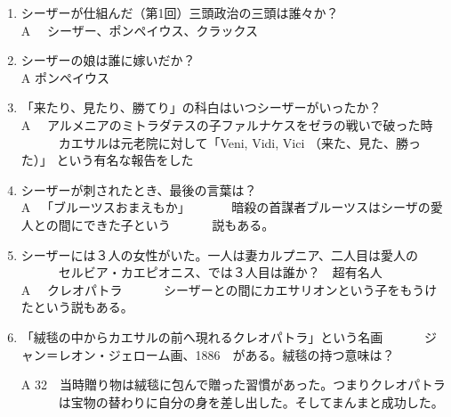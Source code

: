 \documentclass[fleqn]{article}
\begin{document}
\begin{enumerate}
{}



\item{
 シーザーが仕組んだ（第1回）三頭政治の三頭は誰々か？\\
 \vspace{1zw}A 　シーザー、ポンペイウス、クラックス
}

\item{
シーザーの娘は誰に嫁いだか？\\
\vspace{1zw}A 
 ポンペイウス
}

\item{
「来たり、見たり、勝てり」の科白はいつシーザーがいったか？\\
\vspace{1zw}A 
　アルメニアのミトラダテスの子ファルナケスをゼラの戦いで破った時
　　　カエサルは元老院に対して「Veni, Vidi, Vici （来た、見た、勝った）」
      という有名な報告をした
}


\item{
 シーザーが刺されたとき、最後の言葉は？\\
 \vspace{1zw}A 　「ブルーツスおまえもか」
　　　暗殺の首謀者ブルーツスはシーザの愛人との間にできた子という
　　　説もある。
}


\item{
 シーザーには３人の女性がいた。一人は妻カルプニア、二人目は愛人の
　　　セルビア・カエピオニス、では３人目は誰か？　超有名人\\
\vspace{1zw}A 　クレオパトラ
　　　シーザーとの間にカエサリオンという子をもうけたという説もある。
}
\item{
「絨毯の中からカエサルの前へ現れるクレオパトラ」という名画
　　　ジャン＝レオン・ジェローム画、1886　がある。絨毯の持つ意味は？

A 32　当時贈り物は絨毯に包んで贈った習慣があった。つまりクレオパトラ
　　　は宝物の替わりに自分の身を差し出した。そしてまんまと成功した。
}
\end{enumerate}
\end{document}
